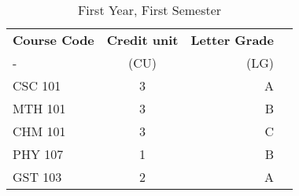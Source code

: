 \documentclass{article}
\begin{document}
	\begin{table}[h!]
		\begin{center}
			\caption{First Year, First Semester}
			\label{tab:table1}
			\begin{tabular}{l|c|r|c|}
				\textbf{Course Code} & \textbf{Credit unit} & \textbf{Letter Grade}\\
				- & (CU) & (LG)\\
				\hline
				CSC 101 & 3 & A\\
				MTH 101 & 3 & B\\
				CHM 101 & 3 & C\\
				PHY 107 & 1 & B\\
				GST 103 & 2 & A\\
			\end{tabular}
		\end{center}
	\end{table}
\end{document}
